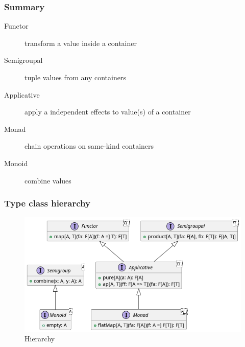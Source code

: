 \begin{frame}
  \frametitle{Summary}

  \begin{description}
    \item[Functor] transform a value inside a container
    \item[Semigroupal] tuple values from any containers
    \item[Applicative] apply a independent effects to value(s) of a container
    \item[Monad] chain operations on same-kind containers
    \item[Monoid] combine values
  \end{description}
\end{frame}

\begin{frame}[fragile]
  \frametitle{Type class hierarchy}

  \begin{figure}[h]
    \centering
    \includegraphics[width=0.9\linewidth]{img/tc-hierarchy.png}
    \caption{Hierarchy}
  \end{figure}
\end{frame}